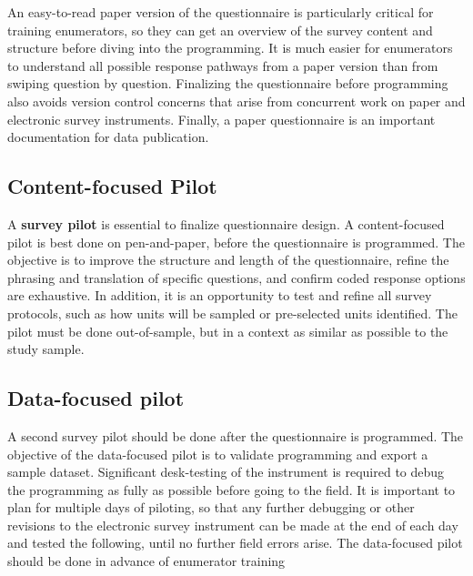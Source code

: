 An easy-to-read paper version of the questionnaire is particularly critical for training enumerators, so they can get an overview of the survey content and structure before diving into the programming.
It is much easier for enumerators to understand all possible response pathways from a paper version than from swiping question by question.
Finalizing the questionnaire before programming also avoids version control concerns that arise from concurrent work on paper and electronic survey instruments.
Finally, a paper questionnaire is an important documentation for data publication.


\subsection{Content-focused Pilot}
A \textbf{survey pilot} is essential to finalize questionnaire design.
A content-focused pilot  is best done on pen-and-paper, before the questionnaire is programmed.
The objective is to improve the structure and length of the questionnaire, refine the phrasing and translation of specific questions, and confirm coded response options are exhaustive. In addition, it is an opportunity to test and refine all survey protocols, such as how units will be sampled or pre-selected units identified. The pilot must be done out-of-sample, but in a context as similar as possible to the study sample.

\subsection{Data-focused pilot}
A second survey pilot should be done after the questionnaire is programmed. 
The objective of the data-focused pilot is to validate programming and export a sample dataset.
Significant desk-testing of the instrument is required to debug the programming as fully as possible before going to the field.
It is important to plan for multiple days of piloting, so that any further debugging or other revisions to the electronic survey instrument can be made at the end of each day and tested the following, until no further field errors arise.
The data-focused pilot should be done in advance of enumerator training


